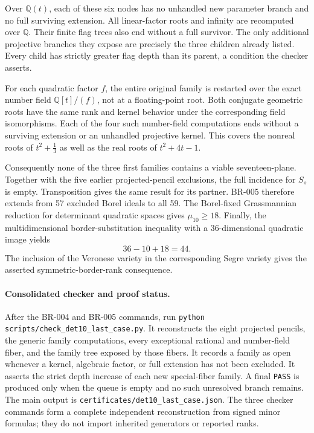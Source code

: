 Over $\mathbb Q(t)$, each of these six nodes has no unhandled new
parameter branch and no full surviving extension.  All linear-factor
roots and infinity are recomputed over $\mathbb Q$.  Their finite
flag trees also end without a full survivor.  The only additional
projective branches they expose are precisely the three children
already listed.  Every child has strictly greater flag depth than
its parent, a condition the checker asserts.

For each quadratic factor $f$, the entire original family is restarted
over the exact number field $\mathbb Q[t]/(f)$, not at a floating-point
root.  Both conjugate geometric roots have the same rank and kernel
behavior under the corresponding field isomorphisms.  Each of the four
such number-field computations ends without a surviving extension or
an unhandled projective kernel.  This covers the nonreal roots of
$t^2+\frac13$ as well as the real roots of $t^2+4t-1$.

Consequently none of the three first families contains a viable
seventeen-plane.  Together with the five earlier projected-pencil
exclusions, the full incidence for $S_\diamond$ is empty.
Transposition gives the same result for its partner.  BR-005 therefore
extends from 57 excluded Borel ideals to all 59.  The Borel-fixed
Grassmannian reduction for determinant quadratic spaces gives
$\mu_{10}\ge18$.  Finally, the multidimensional border-substitution
inequality with a 36-dimensional quadratic image yields
\[
 36-10+18=44.
\]
The inclusion of the Veronese variety in the corresponding Segre
variety gives the asserted symmetric-border-rank consequence.

\paragraph{Consolidated checker and proof status.}
After the BR-004 and BR-005 commands, run
\texttt{python scripts/check\_det10\_last\_case.py}.
It reconstructs the eight projected pencils, the generic family
computations, every exceptional rational and number-field fiber,
and the family tree exposed by those fibers.  It records a family
as open whenever a kernel, algebraic factor, or full extension has
not been excluded.  It asserts the strict depth increase of each
new special-fiber family.  A final \texttt{PASS} is produced only
when the queue is empty and no such unresolved branch remains.
The main output is \texttt{certificates/det10\_last\_case.json}.
The three checker commands form a complete independent reconstruction
from signed minor formulas; they do not import inherited generators
or reported ranks.

